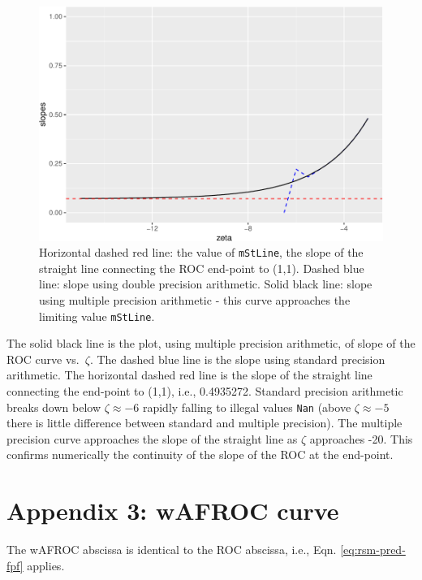 \documentclass[
]{book}
\begin{document}
\begin{figure}
\centering
\includegraphics{07-rsm-predictions_files/figure-latex/rsm-pred-plots1-1.pdf}
\caption{\label{fig:rsm-pred-plots1}Horizontal dashed red line: the value of \texttt{mStLine}, the slope of the straight line connecting the ROC end-point to (1,1). Dashed blue line: slope using double precision arithmetic. Solid black line: slope using multiple precision arithmetic - this curve approaches the limiting value \texttt{mStLine}.}
\end{figure}

The solid black line is the plot, using multiple precision arithmetic, of slope of the ROC curve vs.~\(\zeta\). The dashed blue line is the slope using standard precision arithmetic. The horizontal dashed red line is the slope of the straight line connecting the end-point to (1,1), i.e., 0.4935272. Standard precision arithmetic breaks down below \(\zeta \approx -6\) rapidly falling to illegal values \texttt{Nan} (above \(\zeta \approx -5\) there is little difference between standard and multiple precision). The multiple precision curve approaches the slope of the straight line as \(\zeta\) approaches -20. This confirms numerically the continuity of the slope of the ROC at the end-point.

\hypertarget{rsm-pred-wafroc-curve}{%
\section{Appendix 3: wAFROC curve}\label{rsm-pred-wafroc-curve}}

The wAFROC abscissa is identical to the ROC abscissa, i.e., Eqn. \eqref{eq:rsm-pred-fpf} applies.
\end{document}
